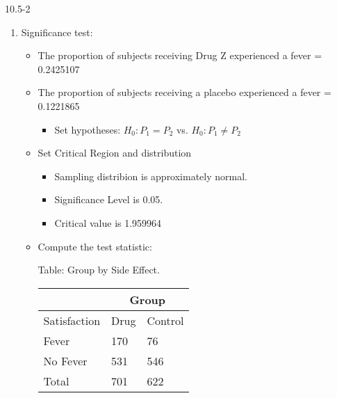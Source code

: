 \begin{exsol@solution}{10.5-2}

\par\nobreak\vspace{\baselineskip}

  \begin{enumerate}
	 \item Significance test:


\begin{itemize}

\item The proportion of subjects receiving Drug Z experienced a fever = 0.2425107
\item The proportion of subjects receiving a placebo experienced a fever = 0.1221865
  \begin{itemize}
  \item Set hypotheses: $H_0: P_1 = P_2$ vs. $H_0: P_1 \ne P_2$
  \end{itemize}

\item Set Critical Region and distribution

  \begin{itemize}
  \item Sampling distribion is approximately normal.
  \item Significance Level is 0.05.
  \item Critical value is 1.959964
  \end{itemize}

\item Compute the test statistic:

\begin{minipage}[h]{6cm}

Table: Group  by Side Effect.

      \begin{tabular}{@{} p{2.5cm} p{1cm} p{1cm} @{}} \hline %
     &  \multicolumn{2}{c}{Group } \\ \hline
     Satisfaction   & Drug & Control \\ \hline
     Fever             & 170 & 76 \\
     No Fever          & 531 & 546 \\ \hline
     Total             & 701 & 622 \\ \hline
   \end{tabular}


\end{minipage}
\end{itemize}
\end{enumerate}
\end{exsol@solution}
